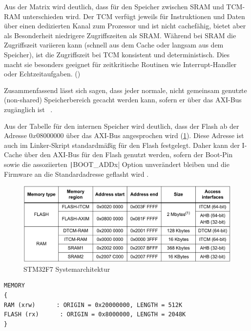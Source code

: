 Aus der Matrix wird deutlich, dass für den Speicher zwischen SRAM und TCM-RAM
unterschieden wird. Der \ac{TCM} verfügt jeweils für Instruktionen und Daten
über einen dedizierten Kanal zum Prozessor und ist nicht cachefähig, bietet aber
als Besonderheit niedrigere Zugriffszeiten als SRAM. Während bei SRAM die
Zugriffszeit variieren kann (schnell aus dem Cache oder langsam aus dem
Speicher), ist die Zugriffszeit bei TCM konsistent und deterministisch. Dies
macht sie besonders geeignet für zeitkritische Routinen wie Interrupt-Handler
oder Echtzeitaufgaben. (\cite{arm_den0042})

Zusammenfassend lässt sich sagen, dass jeder normale, nicht gemeinsam genutzte
(non-shared) Speicherbereich gecacht werden kann, sofern er über das AXI-Bus
zugänglich ist \cite[S. 4]{an4839}~\cite[S. 7]{an4667}.

Aus der Tabelle für den internen Speicher wird deutlich, dass der Flash ab der
Adresse $0x0800 0000$ über das AXI-Bus angesprochen wird
(\ref{fig:internal_mem_table}). Diese Adresse ist auch im Linker-Skript
standardmäßig für den Flash festgelegt. Daher kann der I-Cache über den AXI-Bus
für den Flash genutzt werden, sofern der Boot-Pin sowie die assoziierten
\texttt|BOOT_ADDx| Option unverändert bleiben und die Firmware an die
Standardadresse geflasht wird \cite[S. 28]{stm32_datasheet}.

\begin{figure}[htb]
    \centering
    \includegraphics[width=1\textwidth]{assets/internal_mem_table}
    \caption{STM32F7 Systemarchitektur \cite[S. 14]{an4667}}
    \label{fig:internal_mem_table}
\end{figure}

\begin{code}
\begin{verbatim}
MEMORY
{
RAM (xrw)      : ORIGIN = 0x20000000, LENGTH = 512K
FLASH (rx)      : ORIGIN = 0x8000000, LENGTH = 2048K
}
\end{verbatim}
\end{code}

